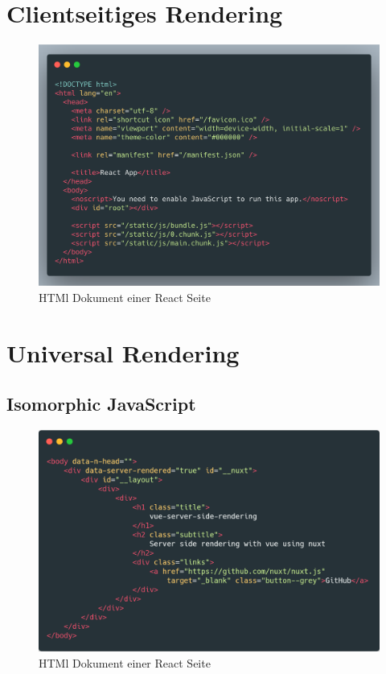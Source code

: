 \documentclass[runningheads]{llncs}
\begin{document}

\section{Clientseitiges Rendering}
\label{sec:Clientseitiges Rendering}
\begin{figure}[h]
  \centering
  \includegraphics[width=12cm]{images/react-code}
  \caption{HTMl Dokument einer React Seite}
  \label{fig:iwilogo}
\end{figure}


\section{Universal Rendering}
\label{sec:Universal Rendering}

\subsection{Isomorphic JavaScript}
\label{subsec:Isomorphic JavaScript}
\begin{figure}[h]
  \centering
  \includegraphics[width=12cm]{images/nuxt-body-first}
  \caption{HTMl Dokument einer React Seite}
  \label{fig:iwilogo}
\end{figure}
\end{document}
